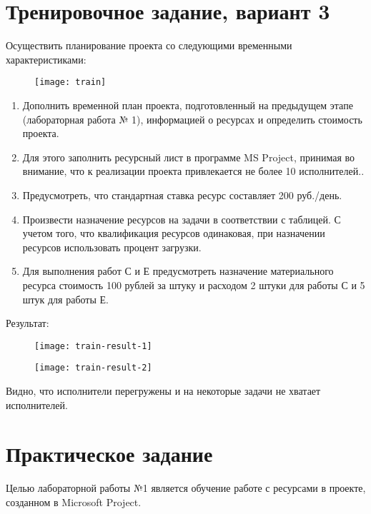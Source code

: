 
\section*{Тренировочное задание, вариант 3}

Осуществить планирование проекта со следующими временными характеристиками:

\begin{figure}[h!]
	\texttt{[image: train]}
\end{figure}

\begin{enumerate}
	\item Дополнить временной план проекта, подготовленный на предыдущем этапе (лабораторная работа № 1), информацией о ресурсах и определить стоимость проекта.
	\item Для этого заполнить ресурсный лист в программе MS Project, принимая во внимание, что к реализации проекта привлекается не более 10 исполнителей..
	\item Предусмотреть, что стандартная ставка ресурс составляет 200 руб./день.
	\item Произвести назначение ресурсов на задачи в соответствии с таблицей. С учетом того, что квалификация ресурсов одинаковая, при назначении ресурсов использовать процент загрузки.
	\item Для выполнения работ С и Е предусмотреть назначение материального ресурса стоимость 100 рублей за штуку и расходом 2 штуки для работы С и 5 штук для работы Е.
\end{enumerate}

Результат: 

\begin{figure}[h!]
	\texttt{[image: train-result-1]}
\end{figure}

\begin{figure}[h!]
	\texttt{[image: train-result-2]}
\end{figure}

Видно, что исполнители перегружены и на некоторые задачи не хватает исполнителей.

\clearpage
\section*{Практическое задание}

Целью лабораторной работы №1 является обучение работе с ресурсами в проекте, созданном в Microsoft Project.

